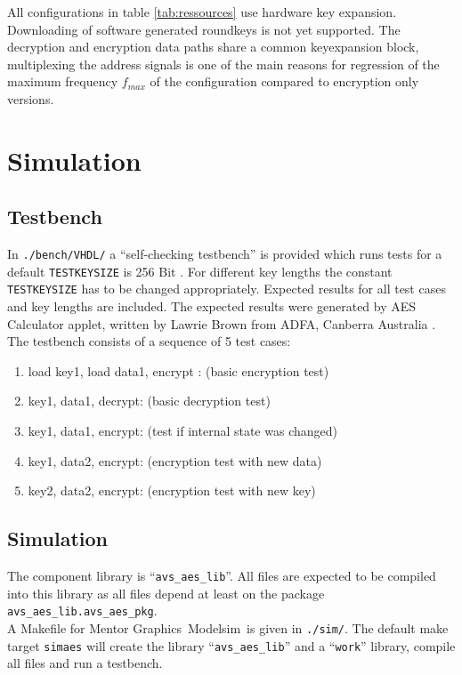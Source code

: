\documentclass{ruschidoc}
\begin{document}
All configurations in table \ref{tab:ressources} use hardware key
expansion. Downloading of software generated roundkeys is not yet supported. The
decryption and encryption data paths share a common keyexpansion block, multiplexing
the address signals is one of the main reasons for regression of the maximum
frequency $f_{max}$ of the configuration compared to encryption only versions. 

\section{Simulation}
\subsection{Testbench}
\label{sec:testbench}
In \texttt{./bench/VHDL/} a ``self-checking testbench'' is provided which runs tests
for a default \texttt{TESTKEYSIZE} is 256 Bit . For different key lengths the
constant \texttt{TESTKEYSIZE} has to be changed appropriately. Expected results for
all test cases and key lengths are included. The expected results were generated by
AES Calculator applet, written by Lawrie Brown from ADFA, Canberra Australia \cite{LaBr05}.  The
testbench consists of a sequence of 5 test cases:
\begin{enumerate}
\item load key1, load data1, encrypt : (basic encryption test)
\item key1, data1, decrypt: (basic decryption test)
\item key1, data1, encrypt: (test if internal state was changed) 
\item key1, data2, encrypt: (encryption test with new data)
\item key2, data2, encrypt: (encryption test with new key) 
\end{enumerate}

\subsection{Simulation}
\label{sec:simulation}
The component library is ``\texttt{avs\_aes\_lib}''. All files are expected to be
compiled into this library as all files depend at least on the package
\texttt{avs\_aes\_lib.avs\_aes\_pkg}. \\
A Makefile for Mentor Graphics\rtm\ Modelsim\rtm\ is given in \texttt{./sim/}. The
default make target \texttt{simaes} will create the library
``\texttt{avs\_aes\_lib}'' and a ``\texttt{work}'' library, compile all files and run
a testbench. \\
\end{document}
